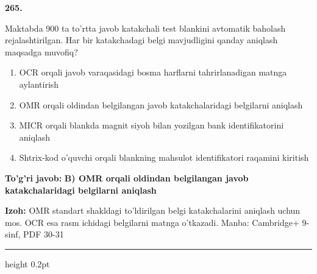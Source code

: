 \documentclass[10pt,a4paper]{article}
\begin{document}
{\bfseries\sffamily\color{ink} 265.}
\par
Maktabda 900 ta to'rtta javob katakchali test blankini avtomatik baholash rejalashtirilgan. Har bir katakchadagi belgi mavjudligini qanday aniqlash maqsadga muvofiq?
\begin{enumerate}[label=\Alph*),leftmargin=9mm]
\item OCR orqali javob varaqasidagi bosma harflarni tahrirlanadigan matnga aylantirish
\item OMR orqali oldindan belgilangan javob katakchalaridagi belgilarni aniqlash
\item MICR orqali blankda magnit siyoh bilan yozilgan bank identifikatorini aniqlash
\item Shtrix-kod o'quvchi orqali blankning mahsulot identifikatori raqamini kiritish
\end{enumerate}
\begin{tcolorbox}[enhanced,breakable,colback=teal!4,colframe=teal!60!black,boxrule=0.45pt,arc=1.2mm,left=2.7mm,right=2.7mm,top=1.8mm,bottom=1.8mm,before skip=2mm,after skip=2mm]
{\bfseries\sffamily\color{teal}To'g'ri javob:} \textbf{B) OMR orqali oldindan belgilangan javob katakchalaridagi belgilarni aniqlash}
\par\smallskip
{\bfseries Izoh:} OMR standart shakldagi to'ldirilgan belgi katakchalarini aniqlash uchun mos. OCR esa rasm ichidagi belgilarni matnga o'tkazadi. Manba: Cambridge+ 9-sinf, PDF 30-31
\end{tcolorbox}
\vspace{2mm}\hrule height 0.2pt\vspace{3mm}
\end{document}
